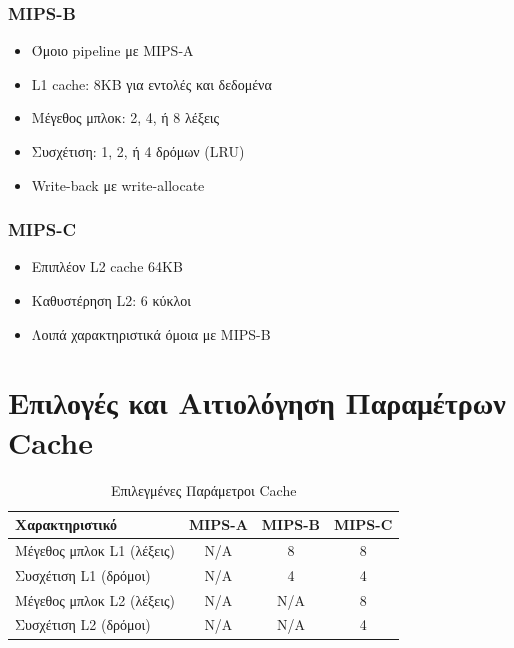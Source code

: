 \documentclass[11pt,a4paper]{article}
\begin{document}
\subsubsection{MIPS-B}
\begin{itemize}
    \item Όμοιο pipeline με MIPS-A
    \item L1 cache: 8KB για εντολές και δεδομένα
    \item Μέγεθος μπλοκ: 2, 4, ή 8 λέξεις
    \item Συσχέτιση: 1, 2, ή 4 δρόμων (LRU)
    \item Write-back με write-allocate
\end{itemize}

\subsubsection{MIPS-C}
\begin{itemize}
    \item Επιπλέον L2 cache 64KB
    \item Καθυστέρηση L2: 6 κύκλοι
    \item Λοιπά χαρακτηριστικά όμοια με MIPS-B
\end{itemize}

\section{Επιλογές και Αιτιολόγηση Παραμέτρων Cache}
\begin{table}[H]
    \centering
    \begin{tabular}{|l|c|c|c|}
        \hline
        \textbf{Χαρακτηριστικό} & \textbf{MIPS-A} & \textbf{MIPS-B} & \textbf{MIPS-C} \\
        \hline
        Μέγεθος μπλοκ L1 (λέξεις) & N/A & 8 & 8 \\
        Συσχέτιση L1 (δρόμοι) & N/A & 4 & 4 \\
        Μέγεθος μπλοκ L2 (λέξεις) & N/A & N/A & 8 \\
        Συσχέτιση L2 (δρόμοι) & N/A & N/A & 4 \\
        \hline
    \end{tabular}
    \caption{Επιλεγμένες Παράμετροι Cache}
    \label{tab:cache-params}
\end{table}
\end{document}
